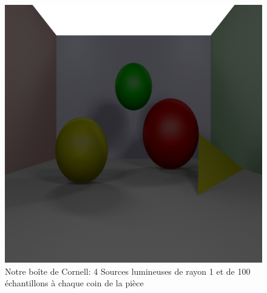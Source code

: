 \documentclass{article}
\begin{document}
\begin{figure}
  \includegraphics[width=\textwidth]{images/mycornell.png}
  \caption{Notre boîte de Cornell: 4 Sources lumineuses de rayon 1 et de 100
  échantillons à chaque coin de la pièce}
\end{figure}
\end{document}
